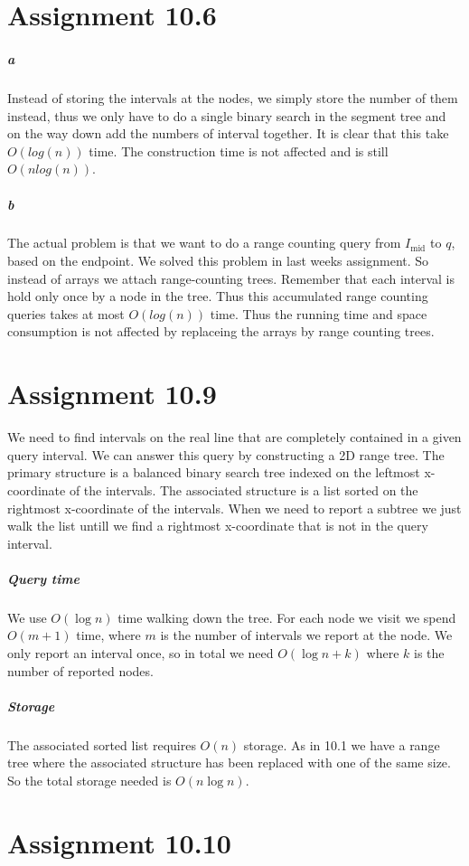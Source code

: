 \documentclass[10pt,a4paper,final,oneside,openany,article,oldfontcommands]{memoir}
\begin{document}
\chapter*{Assignment 10.6}
\paragraph{a} Instead of storing the intervals at the nodes, we simply store
the number of them instead, thus we only have to do a single binary search in
the segment tree and on the way down add the numbers of interval together. It
is clear that this take $O(log(n))$ time. The construction time is not
affected and is still $O(nlog(n))$.

\paragraph{b} The actual problem is that we want to do a range counting query
from $I_\textrm{mid}$ to $q$, based on the endpoint. We solved this problem in
last weeks assignment. So instead of arrays we attach range-counting trees.
Remember that each interval is hold only once by a node in the tree. Thus this
accumulated range counting queries takes at most $O(log(n))$ time. Thus the
running time and space consumption is not affected by replaceing the arrays by
range counting trees.

\chapter*{Assignment 10.9}
We need to find intervals on the real line that are completely contained in a given query interval. We can answer this query by constructing a 2D range tree. The primary structure is a balanced binary search tree indexed on the leftmost x-coordinate of the intervals. The associated structure is a list sorted on the rightmost x-coordinate of the intervals. When we need to report a subtree we just walk the list untill we find a rightmost x-coordinate that is not in the query interval.

\paragraph{Query time}
We use $O(\log n)$ time walking down the tree. For each node we visit we spend $O(m + 1)$ time, where $m$ is the number of intervals we report at the node. We only report an interval once, so in total we need $O(\log n + k)$ where $k$ is the number of reported nodes.

\paragraph{Storage}
The associated sorted list requires $O(n)$ storage. As in 10.1 we have a range tree where the associated structure has been replaced with one of the same size. So the total storage needed is $O(n \log n)$.


\chapter*{Assignment 10.10}

\printbibliography
\end{document}
